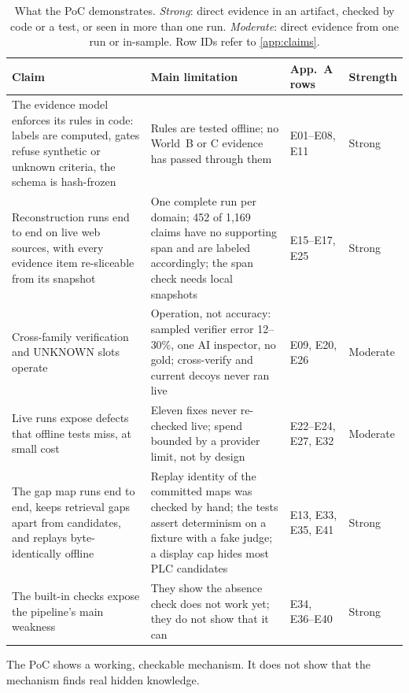 \begin{table}[tbp]
  \centering
  \small
  \caption[What the PoC demonstrates]{What the PoC demonstrates. \emph{Strong}: direct evidence in
  an artifact, checked by code or a test, or seen in more than one run. \emph{Moderate}: direct
  evidence from one run or in-sample. Row IDs refer to \cref{app:claims}.}
  \label{tab:demonstrates}
  \begin{tabularx}{\linewidth}{@{}>{\raggedright\arraybackslash}X
                                   >{\raggedright\arraybackslash}p{4.6cm}
                                   >{\raggedright\arraybackslash}p{1.5cm}
                                   >{\raggedright\arraybackslash}p{1.4cm}@{}}
    \toprule
    Claim & Main limitation & App.~A rows & Strength \\
    \midrule
    The evidence model enforces its rules in code: labels are computed, gates refuse synthetic or
      unknown criteria, the schema is hash-frozen & Rules are tested offline; no World~B or C
      evidence has passed through them & E01--E08, E11 & Strong \\
    \addlinespace
    Reconstruction runs end to end on live web sources, with every evidence item re-sliceable from
      its snapshot & One complete run per domain; 452 of 1,169 claims have no supporting span and are
      labeled accordingly; the span check needs local snapshots & E15--E17, E25 & Strong \\
    \addlinespace
    Cross-family verification and UNKNOWN slots operate & Operation, not accuracy: sampled verifier
      error 12--30\%, one AI inspector, no gold; cross-verify and current decoys never ran live &
      E09, E20, E26 & Moderate \\
    \addlinespace
    Live runs expose defects that offline tests miss, at small cost & Eleven fixes never re-checked
      live; spend bounded by a provider limit, not by design & E22--E24, E27, E32 & Moderate \\
    \addlinespace
    The gap map runs end to end, keeps retrieval gaps apart from candidates, and replays
      byte-identically offline & Replay identity of the committed maps was checked by hand; the tests
      assert determinism on a fixture with a fake judge; a display cap hides most PLC candidates &
      E13, E33, E35, E41 & Strong \\
    \addlinespace
    The built-in checks expose the pipeline's main weakness & They show the absence check does
      not work yet; they do not show that it can & E34, E36--E40 & Strong \\
    \bottomrule
  \end{tabularx}
\end{table}

\begin{findingbox}
  The PoC shows a working, checkable mechanism. It does not show that the mechanism finds real
  hidden knowledge.
\end{findingbox}
